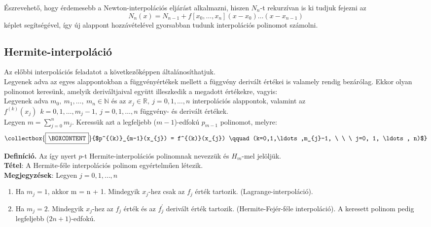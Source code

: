 \documentclass[tikz,12pt,margin=0px]{article}
\newcommand{\mybox}{%
    \collectbox{%
        \setlength{\fboxsep}{4pt}%
        \fbox{\BOXCONTENT}%
    }%
}
\begin{document}
    \noindent Észrevehető, hogy érdemesebb a Newton-interpolációs eljárást alkalmazni, hiszen $N_n$-t rekurzívan is ki tudjuk fejezni az	
    \[
        N_{n}(x) = N_{n-1} + f[x_{0}, \ldots, x_{n}](x-x_{0})\ldots(x-x_{n-1})
    \]
    képlet segítségével, így új alappont hozzávételével gyorsabban tudunk interpolációs polinomot számolni.\\

	\subsection*{Hermite-interpoláció}
	Az előbbi interpolációs feladatot a következőképpen általánosíthatjuk. \\

    \noindent Legyenek adva az egyes alappontokban a függvényértékek mellett a függvény derivált értékei is valamely rendig bezárólag. Ekkor olyan polinomot keresünk, amelyik deriváltjaival együtt
	illeszkedik a megadott értékekre, vagyis:\\
	
	\noindent Legyenek adva $m_{0},\ m_{1},\ldots,\ m_{n} \in \mathbb{N}$ és az $x_{j} \in \mathbb{R},\ j=0, 1, \ldots, n$ interpolációs
	alappontok, valamint az $f^{(k)}(x_{j}) \ \ k=0, 1, \ldots, m_{j}-1,\ j=0, 1, \ldots, n$ függvény- és derivált értékek. \\
    Legyen $m = \displaystyle\sum_{j=0}^{n}m_{j}$. Keressük azt a legfeljebb ($m-1$)-edfokú $p_{m-1}$ polinomot, melyre:\\
	
	\[
		\mybox{$p^{(k)}_{m-1}(x_{j}) = f^{(k)}(x_{j}) \qquad (k=0,1,\ldots,m_{j}-1, \ \ \ j=0, 1, \ldots, n)$}
	\]
	
    \noindent \textbf{Definíció.} Az így nyert $p$-t Hermite-interpolációs polinomnak nevezzük és $H_{m}$-mel jelöljük.\\

	\noindent \textbf{Tétel}: A Hermite-féle interpolációs polinom egyértelműen létezik.\\

	\noindent \textbf{Megjegyzések}: Legyen $j=0, 1, \ldots, n$
	\begin{enumerate}
		\item Ha $m_{j}=1$, akkor m = n + 1. Mindegyik $x_{j}$-hez csak az $f_{j}$ érték tartozik. (Lagrange-interpoláció).
		\item Ha $m_{j}=2$. Mindegyik $x_{j}$-hez az $f_{j}$ érték és az $f_{j}^{'}$ derivált érték tartozik. (Hermite-Fejér-féle interpoláció). A keresett polinom pedig legfeljebb ($2n+1$)-edfokú.
	\end{enumerate}
	
\end{document}
